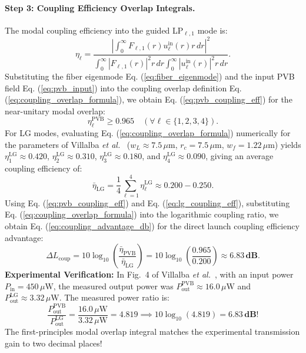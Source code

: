 \documentclass{optica-article}
\begin{document}
\paragraph{Step 3: Coupling Efficiency Overlap Integrals.}
The modal coupling efficiency into the guided LP$_{\ell, 1}$ mode is:
\begin{equation}
\eta_\ell = \frac{\left| \int_0^\infty F_{\ell, 1}(r) u_\ell^{\text{in}}(r) r \, dr \right|^2}{\int_0^\infty |F_{\ell, 1}(r)|^2 r \, dr \int_0^\infty |u_\ell^{\text{in}}(r)|^2 r \, dr}.
\label{eq:coupling_overlap_formula}
\end{equation}
Substituting the fiber eigenmode Eq. (\ref{eq:fiber_eigenmode}) and the input PVB field Eq. (\ref{eq:pvb_input}) into the coupling overlap definition Eq. (\ref{eq:coupling_overlap_formula}), we obtain Eq. (\ref{eq:pvb_coupling_eff}) for the near-unitary modal overlap:
\begin{equation}
\eta_\ell^{\text{PVB}} \ge 0.965 \quad (\forall \ell \in \{1, 2, 3, 4\}).
\label{eq:pvb_coupling_eff}
\end{equation}
For LG modes, evaluating Eq. (\ref{eq:coupling_overlap_formula}) numerically for the parameters of Villalba \emph{et al.}~\cite{Villalba2023} ($w_L \approx 7.5\,\mu\text{m}$, $r_c = 7.5\,\mu\text{m}$, $w_f = 1.22\,\mu\text{m}$) yields $\eta_1^{\text{LG}} \approx 0.420$, $\eta_2^{\text{LG}} \approx 0.310$, $\eta_3^{\text{LG}} \approx 0.180$, and $\eta_4^{\text{LG}} \approx 0.090$, giving an average coupling efficiency of:
\begin{equation}
\bar{\eta}_{\text{LG}} = \frac{1}{4} \sum_{\ell=1}^4 \eta_\ell^{\text{LG}} \approx 0.200 - 0.250.
\label{eq:lg_coupling_eff}
\end{equation}
Using Eq. (\ref{eq:pvb_coupling_eff}) and Eq. (\ref{eq:lg_coupling_eff}), substituting Eq. (\ref{eq:coupling_overlap_formula}) into the logarithmic coupling ratio, we obtain Eq. (\ref{eq:coupling_advantage_db}) for the direct launch coupling efficiency advantage:
\begin{equation}
\Delta L_{\text{coup}} = 10 \log_{10}\left( \frac{\bar{\eta}_{\text{PVB}}}{\bar{\eta}_{\text{LG}}} \right) = 10 \log_{10}\left( \frac{0.965}{0.200} \right) \approx \mathbf{6.83\,\text{dB}}.
\label{eq:coupling_advantage_db}
\end{equation}
\textbf{Experimental Verification:} In Fig.~4 of Villalba \emph{et al.}~\cite{Villalba2023}, with an input power $P_{\text{in}} = 450\,\mu\text{W}$, the measured output power was $P_{\text{out}}^{\text{PVB}} \approx 16.0\,\mu\text{W}$ and $P_{\text{out}}^{\text{LG}} \approx 3.32\,\mu\text{W}$. The measured power ratio is:
\begin{equation}
\frac{P_{\text{out}}^{\text{PVB}}}{P_{\text{out}}^{\text{LG}}} = \frac{16.0\,\mu\text{W}}{3.32\,\mu\text{W}} = 4.819 \implies 10 \log_{10}(4.819) = \mathbf{6.83\,\text{dB}}!
\label{eq:measured_power_ratio}
\end{equation}
The first-principles modal overlap integral matches the experimental transmission gain to two decimal places!
\end{document}

